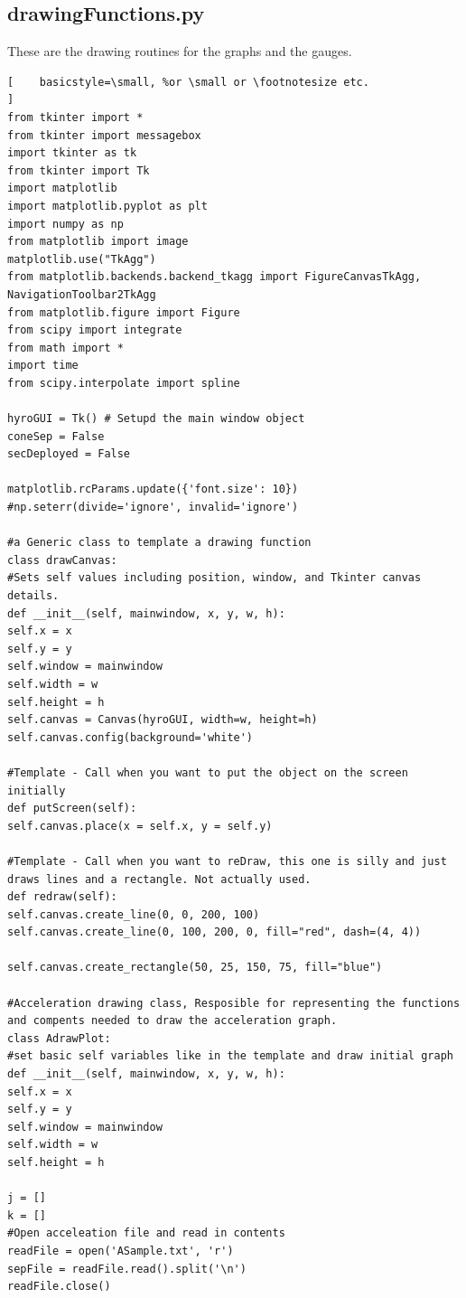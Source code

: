 \documentclass[10pt,draftclsnofoot,onecolumn,retainorgcmds]{IEEEtran}
\begin{document}
\subsection{drawingFunctions.py}
These are the drawing routines for the graphs and the gauges. \par
\begin{lstlisting}[    basicstyle=\small, %or \small or \footnotesize etc.
]
from tkinter import *
from tkinter import messagebox
import tkinter as tk
from tkinter import Tk
import matplotlib
import matplotlib.pyplot as plt
import numpy as np
from matplotlib import image
matplotlib.use("TkAgg")
from matplotlib.backends.backend_tkagg import FigureCanvasTkAgg, NavigationToolbar2TkAgg
from matplotlib.figure import Figure
from scipy import integrate
from math import *
import time
from scipy.interpolate import spline

hyroGUI = Tk() # Setupd the main window object
coneSep = False
secDeployed = False

matplotlib.rcParams.update({'font.size': 10})
#np.seterr(divide='ignore', invalid='ignore')

#a Generic class to template a drawing function
class drawCanvas:
#Sets self values including position, window, and Tkinter canvas details.
def __init__(self, mainwindow, x, y, w, h):
self.x = x
self.y = y
self.window = mainwindow
self.width = w
self.height = h
self.canvas = Canvas(hyroGUI, width=w, height=h)
self.canvas.config(background='white')

#Template - Call when you want to put the object on the screen initially
def putScreen(self):
self.canvas.place(x = self.x, y = self.y)

#Template - Call when you want to reDraw, this one is silly and just draws lines and a rectangle. Not actually used.
def redraw(self):
self.canvas.create_line(0, 0, 200, 100)
self.canvas.create_line(0, 100, 200, 0, fill="red", dash=(4, 4))

self.canvas.create_rectangle(50, 25, 150, 75, fill="blue")

#Acceleration drawing class, Resposible for representing the functions and compents needed to draw the acceleration graph.
class AdrawPlot:
#set basic self variables like in the template and draw initial graph
def __init__(self, mainwindow, x, y, w, h):
self.x = x
self.y = y
self.window = mainwindow
self.width = w
self.height = h

j = []
k = []
#Open acceleation file and read in contents
readFile = open('ASample.txt', 'r')
sepFile = readFile.read().split('\n')
readFile.close()


\end{lstlisting}
\end{document}
